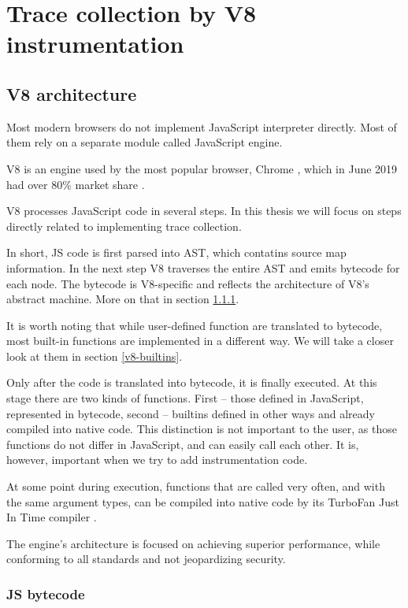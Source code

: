 \chapter{Trace collection by V8 instrumentation}
\label{v8-instrumentation}

\section{V8 architecture}
Most modern browsers do not implement JavaScript interpreter directly. Most of them rely on 
a separate module called JavaScript engine.

V8 is an engine used by the most popular browser, Chrome \cite{v8:main-page}, which in June 2019 
had over 80\% market share  \cite{w3:browsers}.


V8 processes JavaScript code in several steps. In this thesis we will focus on steps
directly related to implementing trace collection.

In short, JS code is first parsed into AST, which contatins source map information. 
In the next step V8 traverses the entire AST and emits bytecode for each node.
The bytecode is V8-specific and reflects the architecture of V8's abstract machine.
More on that in section \ref{v8-bytecode}.

It is worth noting that while user-defined function are translated to bytecode,
most built-in functions are implemented in a different way. We will take a closer look at them
in section \ref{v8-builtins}.

Only after the code is translated into bytecode, it is finally executed. At this stage there are two
kinds of functions. First -- those defined in JavaScript, represented in bytecode, second -- builtins
defined in other ways and already compiled into native code. This distinction is not important 
to the user, as those functions do not differ in JavaScript, and can easily call each other.
It is, however, important when we try to add instrumentation code.

At some point during execution, functions that are called very often, and with the same argument types, can
be compiled into native code by its TurboFan Just In Time compiler \cite{v8:turbofan-jit}.

The engine's architecture is focused on achieving superior performance, while conforming to all
standards and not jeopardizing security. 

\subsection{JS bytecode}
\label{v8-bytecode}

